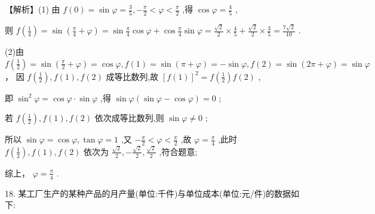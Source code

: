 \documentclass[10pt]{article}
\begin{document}
【解析】(1) 由 \(f\left( 0\right)  = \sin \varphi  = \frac{3}{5}, - \frac{\pi }{2} < \varphi  < \frac{\pi }{2}\) ,得 \(\cos \varphi  = \frac{4}{5}\) ,

则 \(f\left( \frac{1}{4}\right)  = \sin \left( {\frac{\pi }{4} + \varphi }\right)  = \sin \frac{\pi }{4}\cos \varphi  + \cos \frac{\pi }{4}\sin \varphi  = \frac{\sqrt{2}}{2} \times  \frac{4}{5} + \frac{\sqrt{2}}{2} \times  \frac{3}{5} = \frac{7\sqrt{2}}{10}\) .

(2)由 \(f\left( \frac{1}{2}\right)  = \sin \left( {\frac{\pi }{2} + \varphi }\right)  = \cos \varphi ,f\left( 1\right)  = \sin \left( {\pi  + \varphi }\right)  =  - \sin \varphi ,f\left( 2\right)  = \sin \left( {{2\pi } + \varphi }\right)  = \sin \varphi\) ， 因 \(f\left( \frac{1}{2}\right) ,f\left( 1\right) ,f\left( 2\right)\) 成等比数列,故 \({\left\lbrack  f\left( 1\right) \right\rbrack  }^{2} = f\left( \frac{1}{2}\right) f\left( 2\right)\) ,

即 \({\sin }^{2}\varphi  = \cos \varphi  \cdot  \sin \varphi\) ,得 \(\sin \varphi \left( {\sin \varphi  - \cos \varphi }\right)  = 0\) ;

若 \(f\left( \frac{1}{2}\right) ,f\left( 1\right) ,f\left( 2\right)\) 依次成等比数列,则 \(\sin \varphi  \neq  0\) ;

所以 \(\sin \varphi  = \cos \varphi ,\tan \varphi  = 1\) ,又 \(- \frac{\pi }{2} < \varphi  < \frac{\pi }{2}\) ,故 \(\varphi  = \frac{\pi }{4}\) ,此时 \(f\left( \frac{1}{2}\right) ,f\left( 1\right) ,f\left( 2\right)\) 依次为 \(\frac{\sqrt{2}}{2}, - \frac{\sqrt{2}}{2},\frac{\sqrt{2}}{2}\) ,符合题意;

综上， \(\varphi  = \frac{\pi }{4}\) .

18. 某工厂生产的某种产品的月产量(单位:千件)与单位成本(单位:元/件)的数据如下:

\begin{center}
\end{center}
\end{document}

